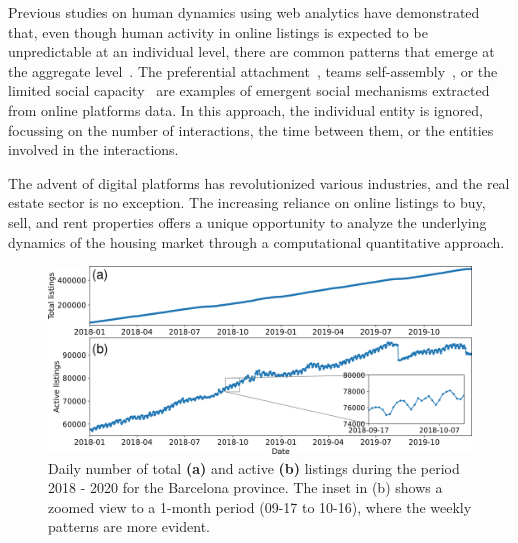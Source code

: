 Previous studies on human dynamics using web analytics have demonstrated that, even though human activity in online listings is expected to be unpredictable at an individual level, there are common patterns that emerge at the aggregate level~\cite{Lazer2009CompSocSci}. The preferential attachment~\cite{barabasi1999emergence,goncalves-2008}, teams self-assembly~\cite{guimera-2005}, or the limited social capacity~\cite{goncalves-2011,dunbar-2012} are examples of emergent social mechanisms extracted from online platforms data. In this approach, the individual entity is ignored, focussing on the number of interactions, the time between them, or the entities involved in the interactions.

The advent of digital platforms has revolutionized various industries, and the real estate sector is no exception. The increasing reliance on online listings to buy, sell, and rent properties offers a unique opportunity to analyze the underlying dynamics of the housing market through a computational quantitative approach. 


\begin{figure}
    \vspace{0.2 cm}
    \centering
    \includegraphics[width =\textwidth]{Figs/Idealista_dynamics/adds_evo.pdf}
	\caption[Active listings' evolution.]{\label{fig:active_adds} Daily number of total \textbf{(a)} and active \textbf{(b)} listings during the period 2018 - 2020 for the Barcelona province. The inset in (b) shows a zoomed view to a 1-month period (09-17 to 10-16), where the weekly patterns are more evident.}
\end{figure}

